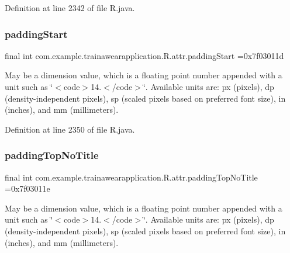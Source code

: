Definition at line 2342 of file R.\+java.

\mbox{\label{classcom_1_1example_1_1trainawearapplication_1_1_r_1_1attr_abca22fbbfcdd1f3a76098fbd249eb76e}} 
\subsubsection{\texorpdfstring{paddingStart}{paddingStart}}
{\footnotesize\ttfamily final int com.\+example.\+trainawearapplication.\+R.\+attr.\+padding\+Start =0x7f03011d\hspace{0.3cm}{\ttfamily [static]}}

May be a dimension value, which is a floating point number appended with a unit such as \char`\"{}$<$code$>$14.\+5sp$<$/code$>$\char`\"{}. Available units are\+: px (pixels), dp (density-\/independent pixels), sp (scaled pixels based on preferred font size), in (inches), and mm (millimeters). 

Definition at line 2350 of file R.\+java.

\mbox{\label{classcom_1_1example_1_1trainawearapplication_1_1_r_1_1attr_a4008793c239ca3f1be8b2612b03c291d}} 
\subsubsection{\texorpdfstring{paddingTopNoTitle}{paddingTopNoTitle}}
{\footnotesize\ttfamily final int com.\+example.\+trainawearapplication.\+R.\+attr.\+padding\+Top\+No\+Title =0x7f03011e\hspace{0.3cm}{\ttfamily [static]}}

May be a dimension value, which is a floating point number appended with a unit such as \char`\"{}$<$code$>$14.\+5sp$<$/code$>$\char`\"{}. Available units are\+: px (pixels), dp (density-\/independent pixels), sp (scaled pixels based on preferred font size), in (inches), and mm (millimeters). 

